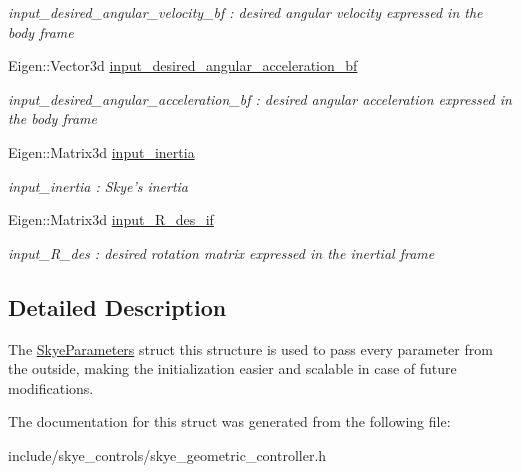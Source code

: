 \begin{DoxyCompactItemize}
\begin{DoxyCompactList}\small\item\em input\-\_\-desired\-\_\-angular\-\_\-velocity\-\_\-bf \-: desired angular velocity expressed in the body frame \end{DoxyCompactList}\item 
\hypertarget{struct_skye_parameters_af0ea0ec407eaef0ddec28e96ab098d1c}{Eigen\-::\-Vector3d \hyperlink{struct_skye_parameters_af0ea0ec407eaef0ddec28e96ab098d1c}{input\-\_\-desired\-\_\-angular\-\_\-acceleration\-\_\-bf}}\label{struct_skye_parameters_af0ea0ec407eaef0ddec28e96ab098d1c}

\begin{DoxyCompactList}\small\item\em input\-\_\-desired\-\_\-angular\-\_\-acceleration\-\_\-bf \-: desired angular acceleration expressed in the body frame \end{DoxyCompactList}\item 
\hypertarget{struct_skye_parameters_a008add5ffc2700bd3af1caec5411af1d}{Eigen\-::\-Matrix3d \hyperlink{struct_skye_parameters_a008add5ffc2700bd3af1caec5411af1d}{input\-\_\-inertia}}\label{struct_skye_parameters_a008add5ffc2700bd3af1caec5411af1d}

\begin{DoxyCompactList}\small\item\em input\-\_\-inertia \-: Skye's inertia \end{DoxyCompactList}\item 
\hypertarget{struct_skye_parameters_acc2c9df1cdc2feb5695ae3dc49c7b838}{Eigen\-::\-Matrix3d \hyperlink{struct_skye_parameters_acc2c9df1cdc2feb5695ae3dc49c7b838}{input\-\_\-\-R\-\_\-des\-\_\-if}}\label{struct_skye_parameters_acc2c9df1cdc2feb5695ae3dc49c7b838}

\begin{DoxyCompactList}\small\item\em input\-\_\-\-R\-\_\-des \-: desired rotation matrix expressed in the inertial frame \end{DoxyCompactList}\end{DoxyCompactItemize}


\subsection{Detailed Description}
The \hyperlink{struct_skye_parameters}{Skye\-Parameters} struct this structure is used to pass every parameter from the outside, making the initialization easier and scalable in case of future modifications. 

The documentation for this struct was generated from the following file\-:\begin{DoxyCompactItemize}
\item 
include/skye\-\_\-controls/skye\-\_\-geometric\-\_\-controller.\-h\end{DoxyCompactItemize}
